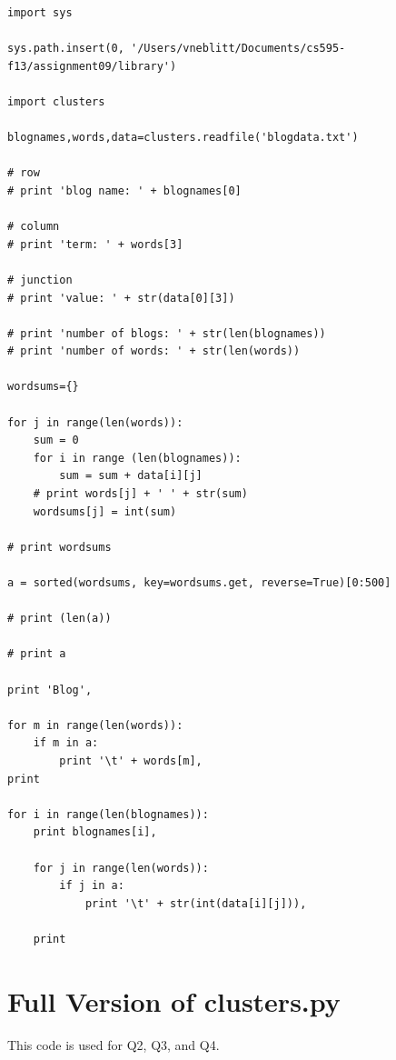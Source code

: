 \documentclass{article}
\begin{document}
\begin{lstlisting}[frame=single, caption=reduceTerms.py, label=reduceTerms]
import sys

sys.path.insert(0, '/Users/vneblitt/Documents/cs595-f13/assignment09/library')

import clusters

blognames,words,data=clusters.readfile('blogdata.txt')

# row
# print 'blog name: ' + blognames[0]

# column
# print 'term: ' + words[3]

# junction
# print 'value: ' + str(data[0][3])

# print 'number of blogs: ' + str(len(blognames))
# print 'number of words: ' + str(len(words))

wordsums={}

for j in range(len(words)):
	sum = 0
	for i in range (len(blognames)):
		sum = sum + data[i][j]
	# print words[j] + ' ' + str(sum)
	wordsums[j] = int(sum)
	
# print wordsums

a = sorted(wordsums, key=wordsums.get, reverse=True)[0:500]

# print (len(a))

# print a

print 'Blog',

for m in range(len(words)):
	if m in a:
		print '\t' + words[m],
print

for i in range(len(blognames)):
	print blognames[i],
		
	for j in range(len(words)):
		if j in a:
			print '\t' + str(int(data[i][j])),
			
	print
\end{lstlisting}

\section{Full Version of clusters.py}

This code is used for Q2, Q3, and Q4.
\end{document}
